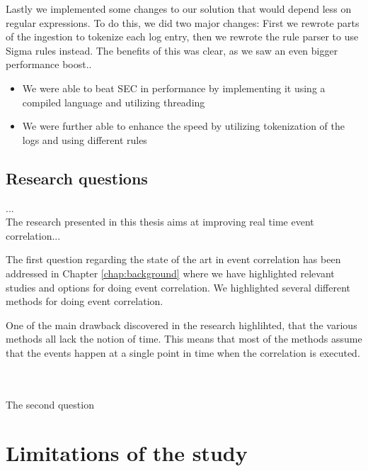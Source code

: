 Lastly we implemented some changes to our solution that would depend less on regular expressions. To do this, we did two major changes: First we rewrote parts of the ingestion to tokenize each log entry, then we rewrote the rule parser to use Sigma rules instead. The benefits of this was clear, as we saw an even bigger performance boost..


\iffalse
high signal low noise
1000 = 40.17%
10 000 = 34.19%
100 000 = 22.78%
1 000 000 = 20.5%

baseline
1000 = 89.5%
10 000 = 135.7%
100 000 = 127%
1 000 000 = 101.1%

\fi
\begin{itemize}
    \item We were able to beat SEC in performance by implementing it using a compiled language and utilizing threading
    \item We were further able to enhance the speed by utilizing tokenization of the logs and using different rules
\end{itemize}


\subsection{Research questions}
...\\
The research presented in this thesis aims at improving real time event correlation...


The first question regarding the state of the art in event correlation has been addressed in Chapter \ref{chap:background} where we have highlighted relevant studies and options for doing event correlation. We highlighted several different methods for doing event correlation.

One of the main drawback discovered in the research highlihted, that the various methods all lack the notion of time. This means that most of the methods assume that the events happen at a single point in time when the correlation is executed.


\\
\\
The second question 







\section{Limitations of the study}
\label{sec:limitations}

